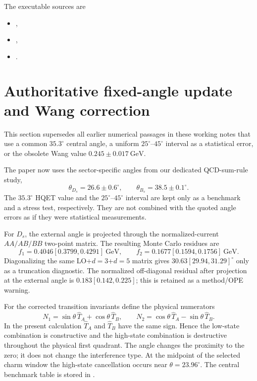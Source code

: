 \documentclass[11pt]{article}
\newcommand{\GeV}{\mathrm{GeV}}
\begin{document}
The executable sources are
\begin{itemize}
  \item {},
  \item {},
  \item {}.
\end{itemize}

\section{Authoritative fixed-angle update and Wang correction}
\label{sec:authoritative-fixed-angle-update}

This section supersedes all earlier numerical passages in these working notes
that use a common $35.3^\circ$ central angle, a uniform $25^\circ$--$45^\circ$
interval as a statistical error, or the obsolete Wang value
$0.245\pm0.017~\GeV$.

The paper now uses the sector-specific angles from our dedicated QCD-sum-rule
study,
\begin{equation}
\theta_{D_s}=26.6\pm0.6^\circ,\qquad
\theta_{B_s}=38.5\pm0.1^\circ.
\end{equation}
The $35.3^\circ$ HQET value and the $25^\circ$--$45^\circ$ interval are kept
only as a benchmark and a stress test, respectively.  They are not combined
with the quoted angle errors as if they were statistical measurements.

For $D_s$, the external angle is projected through the normalized-current
$AA/AB/BB$ two-point matrix.  The resulting Monte Carlo residues are
\begin{equation}
f_1=0.4046[0.3799,0.4291]~\GeV,\qquad
f_2=0.1677[0.1594,0.1756]~\GeV.
\end{equation}
Diagonalizing the same LO+$d=3$+$d=5$ matrix gives
$30.63[29.94,31.29]^\circ$ only as a truncation diagnostic.  The normalized
off-diagonal residual after projection at the external angle is
$0.183[0.142,0.225]$; this is retained as a method/OPE warning.

For the corrected transition invariants define the physical numerators
\begin{equation}
N_1=\sin\theta\,\widehat T_A+\cos\theta\,\widehat T_B,\qquad
N_2=\cos\theta\,\widehat T_A-\sin\theta\,\widehat T_B.
\end{equation}
In the present calculation $\widehat T_A$ and $\widehat T_B$ have the same
sign.  Hence the low-state
combination is constructive and the high-state combination is destructive
throughout the physical first quadrant.  The angle changes the proximity to
the zero; it does not change the interference type.  At the midpoint of the
selected charm window the high-state cancellation occurs near
$\theta=23.96^\circ$.  The central benchmark table is stored in
.
\end{document}
